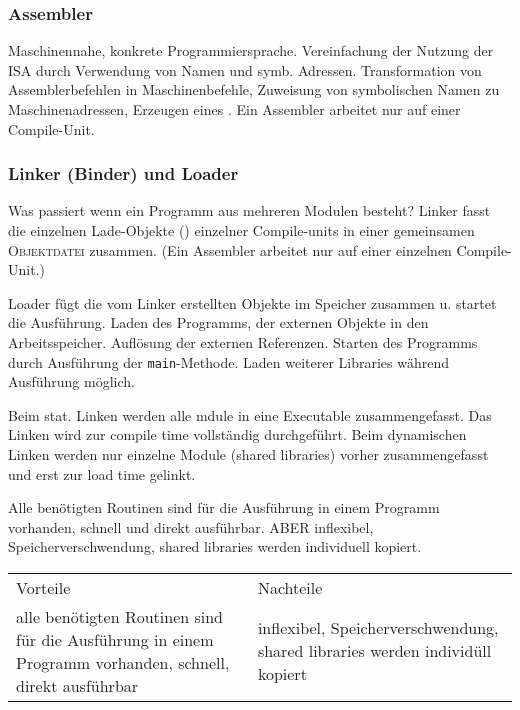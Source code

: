 \subsubsection{Assembler}
Maschinennahe, konkrete Programmiersprache. Vereinfachung der Nutzung der ISA durch Verwendung von Namen und symb. Adressen. 
Transformation von Assemblerbefehlen in Maschinenbefehle, Zuweisung von symbolischen Namen zu Maschinenadressen, Erzeugen eines . Ein Assembler arbeitet nur auf einer Compile-Unit. 

\subsubsection{Linker (Binder) und Loader}
Was passiert wenn ein Programm aus mehreren Modulen besteht?
Linker fasst die einzelnen Lade-Objekte () einzelner Compile-units in einer gemeinsamen \textsc{Objektdatei} zusammen. (Ein Assembler arbeitet nur auf einer einzelnen Compile-Unit.) 

Loader fügt die vom Linker erstellten Objekte im Speicher zusammen u. startet die Ausführung. Laden des Programms, der externen Objekte in den Arbeitsspeicher. Auflösung der externen Referenzen. Starten des Programms durch Ausführung der \texttt{main}-Methode. Laden weiterer Libraries während Ausführung möglich. 

Beim stat. Linken werden alle mdule in eine Executable zusammengefasst. Das Linken wird zur compile time vollständig durchgeführt. Beim dynamischen Linken werden nur einzelne Module (shared libraries) vorher zusammengefasst und erst zur load time gelinkt. 

Alle benötigten Routinen sind für die Ausführung in einem Programm vorhanden, schnell und direkt ausführbar. ABER inflexibel, Speicherverschwendung, shared libraries werden individuell kopiert. 

\begin{tabularx}{\textwidth}{X X}
	Vorteile& Nachteile\\
	alle benötigten Routinen sind für die Ausführung in einem Programm vorhanden, schnell, direkt ausführbar& inflexibel, Speicherverschwendung, shared libraries werden individüll kopiert\\ 
\end{tabularx}


